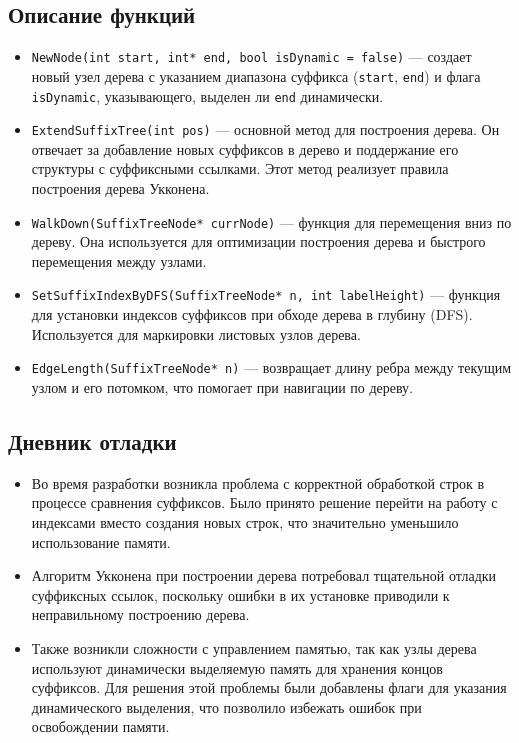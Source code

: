 \documentclass[12pt]{article}
\begin{document}
\subsection*{Описание функций}

\begin{itemize}
    \item \texttt{NewNode(int start, int* end, bool isDynamic = false)} — создает новый узел дерева с указанием диапазона суффикса (\texttt{start}, \texttt{end}) и флага \texttt{isDynamic}, указывающего, выделен ли \texttt{end} динамически.
    \item \texttt{ExtendSuffixTree(int pos)} — основной метод для построения дерева. Он отвечает за добавление новых суффиксов в дерево и поддержание его структуры с суффиксными ссылками. Этот метод реализует правила построения дерева Укконена.
    \item \texttt{WalkDown(SuffixTreeNode* currNode)} — функция для перемещения вниз по дереву. Она используется для оптимизации построения дерева и быстрого перемещения между узлами.
    \item \texttt{SetSuffixIndexByDFS(SuffixTreeNode* n, int labelHeight)} — функция для установки индексов суффиксов при обходе дерева в глубину (DFS). Используется для маркировки листовых узлов дерева.
    \item \texttt{EdgeLength(SuffixTreeNode* n)} — возвращает длину ребра между текущим узлом и его потомком, что помогает при навигации по дереву.
\end{itemize}

\subsection*{Дневник отладки}

\begin{itemize}
    \item Во время разработки возникла проблема с корректной обработкой строк в процессе сравнения суффиксов. Было принято решение перейти на работу с индексами вместо создания новых строк, что значительно уменьшило использование памяти.
    \item Алгоритм Укконена при построении дерева потребовал тщательной отладки суффиксных ссылок, поскольку ошибки в их установке приводили к неправильному построению дерева.
    \item Также возникли сложности с управлением памятью, так как узлы дерева используют динамически выделяемую память для хранения концов суффиксов. Для решения этой проблемы были добавлены флаги для указания динамического выделения, что позволило избежать ошибок при освобождении памяти.
\end{itemize}
\end{document}
